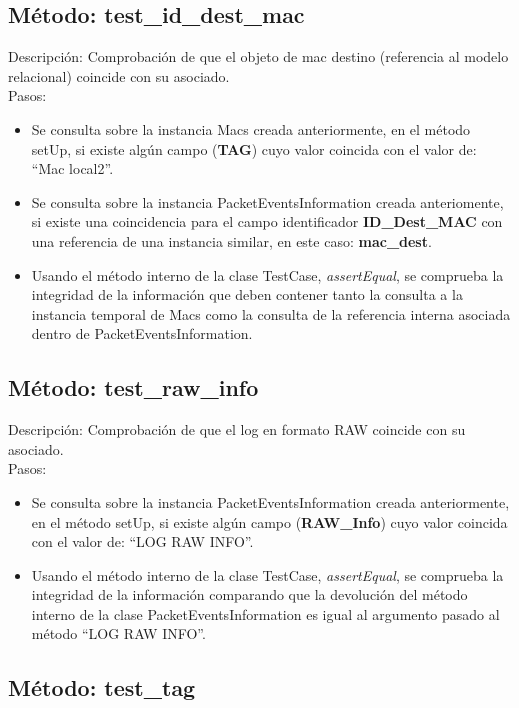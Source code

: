 \subsection{Método: test\_id\_dest\_mac}

Descripción: Comprobación de que el objeto de mac destino (referencia al modelo relacional) coincide con su asociado.\\
Pasos:
\begin{itemize}
\item Se consulta sobre la instancia Macs creada anteriormente, en el método setUp, si existe algún campo (\textbf{TAG}) cuyo valor coincida con el valor de: ``Mac local2''.
\item Se consulta sobre la instancia PacketEventsInformation creada anteriomente, si existe una coincidencia para el campo identificador \textbf{ID\_Dest\_MAC} con una referencia de una instancia similar, en este caso: \textbf{mac\_dest}.
\item Usando el método interno de la clase TestCase, \emph{assertEqual}, se comprueba la integridad de la información que deben contener tanto la consulta a la instancia temporal de Macs como la consulta de la referencia interna asociada dentro de PacketEventsInformation.
\end{itemize}



\subsection{Método: test\_raw\_info}

Descripción: Comprobación de que el log en formato RAW coincide con su asociado.\\
Pasos:
\begin{itemize}
\item Se consulta sobre la instancia PacketEventsInformation creada anteriormente, en el método setUp, si existe algún campo (\textbf{RAW\_Info}) cuyo valor coincida con el valor de: ``LOG RAW INFO''.
\item Usando el método interno de la clase TestCase, \emph{assertEqual}, se comprueba la integridad de la información comparando que la devolución del método interno de la clase PacketEventsInformation es igual al argumento pasado al método ``LOG RAW INFO''.
\end{itemize}



\subsection{Método: test\_tag}

